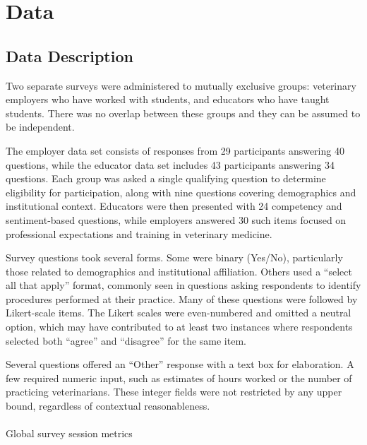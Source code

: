 \documentclass[
  11pt,
  letterpaper,
  DIV=11,
  numbers=noendperiod]{scrartcl}
\makeatletter
\let\oldparagraph\paragraph
\renewcommand{\paragraph}{
    \@ifstar
      \xxxParagraphStar
      \xxxParagraphNoStar
  }
\newcommand{\xxxParagraphStar}[1]{\oldparagraph*{#1}\mbox{}}
\newcommand{\xxxParagraphNoStar}[1]{\oldparagraph{#1}\mbox{}}
\numberwithin{figure}{section}
\makeatother
\begin{document}
\section{Data}\label{data}

\subsection{Data Description}\label{data-description}

Two separate surveys were administered to mutually exclusive groups:
veterinary employers who have worked with students, and educators who
have taught students. There was no overlap between these groups and they
can be assumed to be independent.

The employer data set consists of responses from 29 participants
answering 40 questions, while the educator data set includes 43
participants answering 34 questions. Each group was asked a single
qualifying question to determine eligibility for participation, along
with nine questions covering demographics and institutional context.
Educators were then presented with 24 competency and sentiment-based
questions, while employers answered 30 such items focused on
professional expectations and training in veterinary medicine.

Survey questions took several forms. Some were binary (Yes/No),
particularly those related to demographics and institutional
affiliation. Others used a ``select all that apply'' format, commonly
seen in questions asking respondents to identify procedures performed at
their practice. Many of these questions were followed by Likert-scale
items. The Likert scales were even-numbered and omitted a neutral
option, which may have contributed to at least two instances where
respondents selected both ``agree'' and ``disagree'' for the same item.

Several questions offered an ``Other'' response with a text box for
elaboration. A few required numeric input, such as estimates of hours
worked or the number of practicing veterinarians. These integer fields
were not restricted by any upper bound, regardless of contextual
reasonableness.

\paragraph{Global survey session
metrics}\label{global-survey-session-metrics}
\end{document}
